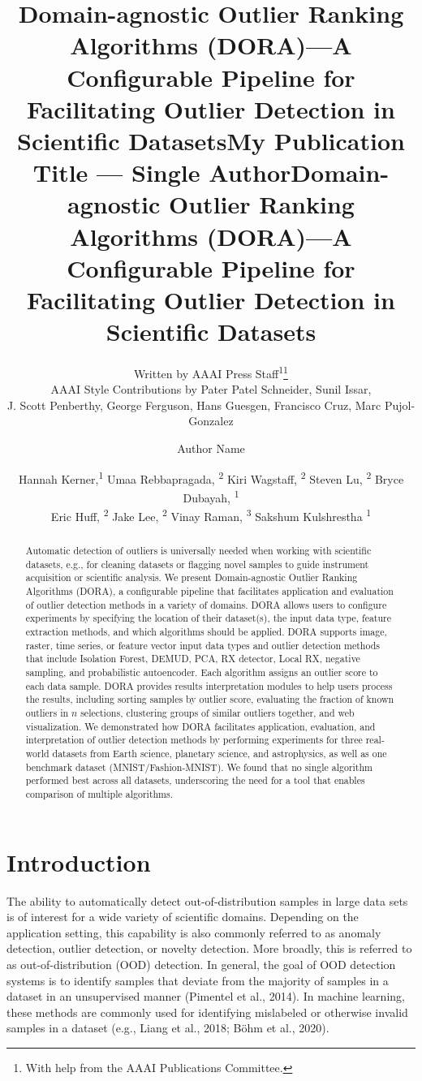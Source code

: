 \documentclass[letterpaper]{article} %
\title{Domain-agnostic Outlier Ranking Algorithms (DORA)---A Configurable Pipeline for Facilitating Outlier Detection in Scientific Datasets}
\author{
    Written by AAAI Press Staff\textsuperscript{\rm 1}\thanks{With help from the AAAI Publications Committee.}\\
    AAAI Style Contributions by Pater Patel Schneider,
    Sunil Issar,  \\
    J. Scott Penberthy,
    George Ferguson,
    Hans Guesgen,
    Francisco Cruz,
    Marc Pujol-Gonzalez
    \\
}
\title{My Publication Title --- Single Author}
\author {
    Author Name \\
}
\title{Domain-agnostic Outlier Ranking Algorithms (DORA)---A Configurable Pipeline for Facilitating Outlier Detection in Scientific Datasets}
\author {
    Hannah Kerner,\textsuperscript{\rm 1}
    Umaa Rebbapragada, \textsuperscript{\rm 2}
    Kiri Wagstaff, \textsuperscript{\rm 2} 
    Steven Lu, \textsuperscript{\rm 2} 
    Bryce Dubayah, \textsuperscript{\rm 1} \\
    Eric Huff, \textsuperscript{\rm 2} 
    Jake Lee, \textsuperscript{\rm 2} 
    Vinay Raman, \textsuperscript{\rm 3}
    Sakshum Kulshrestha \textsuperscript{\rm 1}  \\
}
\begin{document}
\maketitle

\begin{abstract}
Automatic detection of outliers is
universally needed when working with scientific datasets, e.g., for cleaning 
datasets or flagging novel samples to guide instrument acquisition or
 scientific analysis.
We present Domain-agnostic Outlier Ranking Algorithms (DORA),
a configurable pipeline that facilitates application and evaluation of
outlier detection methods in a variety of domains. DORA allows users to 
configure experiments by specifying the location of their 
dataset(s), the input data type, feature extraction methods, and which 
algorithms should be applied. DORA supports image, raster, time series, 
or feature vector input data types and outlier detection methods that include
 Isolation Forest, DEMUD, PCA, RX detector, 
 Local RX, negative sampling, and probabilistic autoencoder. Each algorithm assigns an outlier score to each data sample. DORA
   provides results interpretation modules to help users 
   process the results, including sorting samples by outlier score, evaluating 
   the fraction of known outliers in $n$ selections, clustering groups of 
   similar outliers together, and web visualization. We demonstrated how DORA
   facilitates application, evaluation, and interpretation of outlier detection
   methods by performing
    experiments for three real-world datasets from Earth science, planetary
  science, and astrophysics, as well as one benchmark dataset 
  (MNIST/Fashion-MNIST). We found that no single algorithm
      performed best across all datasets, underscoring the need for a tool 
      that enables comparison of multiple algorithms.
\end{abstract}

\section{Introduction}
The ability to automatically detect out-of-distribution samples in large data 
sets is of interest for a wide variety of scientific domains. Depending on the
 application setting, this capability is also commonly referred to as anomaly
  detection, outlier detection, or novelty detection. More broadly, this is 
  referred to as out-of-distribution (OOD) detection. In general, the goal of 
  OOD detection systems is to identify samples that deviate from the majority
   of samples in a dataset in an unsupervised manner (Pimentel et al., 2014). 
   In machine learning, these methods are commonly used for identifying 
   mislabeled or otherwise invalid samples in a dataset 
   (e.g., Liang et al., 2018; Böhm et al., 2020). 
   
\end{document}
